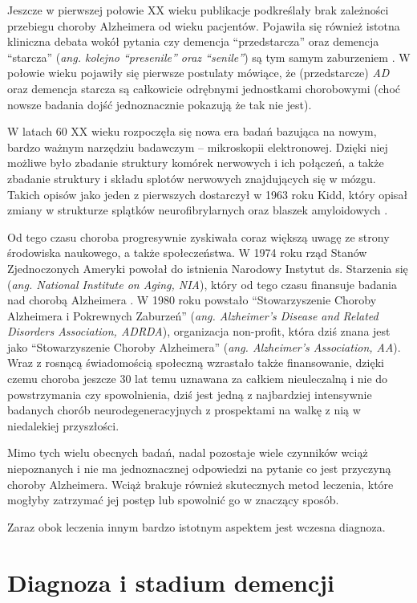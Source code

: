 Jeszcze w pierwszej połowie XX wieku publikacje podkreślały brak zależności przebiegu choroby Alzheimera od wieku pacjentów.
Pojawiła się również istotna kliniczna debata wokół pytania czy demencja ``przedstarcza'' oraz demencja ``starcza'' (\emph{ang. kolejno ``presenile'' oraz ``senile''}) są tym samym zaburzeniem \cite{jellinger2006alzheimer}.
W połowie wieku pojawiły się pierwsze postulaty mówiące, że (przedstarcze) \emph{AD} oraz demencja starcza są całkowicie odrębnymi jednostkami chorobowymi (choć nowsze badania dojść jednoznacznie pokazują że tak nie jest).

W latach 60 XX wieku rozpoczęła się nowa era badań bazująca na nowym, bardzo ważnym narzędziu badawczym -- mikroskopii elektronowej.
Dzięki niej możliwe było zbadanie struktury komórek nerwowych i ich połączeń, a także zbadanie struktury i składu splotów nerwowych znajdujących się w mózgu.
Takich opisów jako jeden z pierwszych dostarczył w 1963 roku Kidd, który opisał zmiany w strukturze splątków neurofibrylarnych oraz blaszek amyloidowych \cite{kidd1963paired}.

Od tego czasu choroba progresywnie zyskiwała coraz większą uwagę ze strony środowiska naukowego, a także społeczeństwa.
W 1974 roku rząd Stanów Zjednoczonych Ameryki powołał do istnienia Narodowy Instytut ds. Starzenia się (\emph{ang. National Institute on Aging, NIA}), który od tego czasu finansuje badania nad chorobą Alzheimera \cite{marx1974aging}.
W 1980 roku powstało ``Stowarzyszenie Choroby Alzheimera i Pokrewnych Zaburzeń'' (\emph{ang. Alzheimer's Disease and Related Disorders Association, ADRDA}), organizacja non-profit, która dziś znana jest jako ``Stowarzyszenie Choroby Alzheimera'' (\emph{ang. Alzheimer's Association, AA}).
Wraz z rosnącą świadomością społeczną wzrastało także finansowanie, dzięki czemu choroba jeszcze 30 lat temu uznawana za całkiem nieuleczalną i nie do powstrzymania czy spowolnienia, dziś jest jedną z najbardziej intensywnie badanych chorób neurodegeneracyjnych z prospektami na walkę z nią w niedalekiej przyszłości.

Mimo tych wielu obecnych badań, nadal pozostaje wiele czynników wciąż niepoznanych i nie ma jednoznacznej odpowiedzi na pytanie co jest przyczyną choroby Alzheimera.
Wciąż brakuje również skutecznych metod leczenia, które mogłyby zatrzymać jej postęp lub spowolnić go w znaczący sposób.

Zaraz obok leczenia innym bardzo istotnym aspektem jest wczesna diagnoza.

\section{Diagnoza i stadium demencji}



